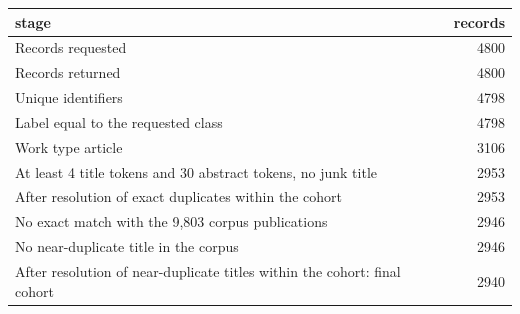 \begin{tabular}{lr}
\toprule
stage & records \\
\midrule
Records requested & 4800 \\
Records returned & 4800 \\
Unique identifiers & 4798 \\
Label equal to the requested class & 4798 \\
Work type article & 3106 \\
At least 4 title tokens and 30 abstract tokens, no junk title & 2953 \\
After resolution of exact duplicates within the cohort & 2953 \\
No exact match with the 9,803 corpus publications & 2946 \\
No near-duplicate title in the corpus & 2946 \\
After resolution of near-duplicate titles within the cohort: final cohort & 2940 \\
\bottomrule
\end{tabular}
